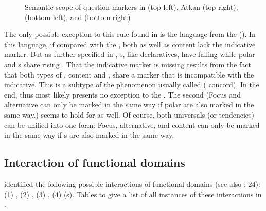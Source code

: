 \begin{figure}
\caption{Semantic scope of question markers in  (top left), Atkan  (top right),  (bottom left), and  (bottom right)}
\label{fig:6:1}
\end{figure}

The only possible exception to this rule found in  is the  language  from the   (\citealt{Davis2015}). In this language, if compared with the , both  as well as content  lack the indicative marker. But as further specified in , s, like declaratives, have falling  while polar and s share rising . That the indicative marker is missing results from the fact that both types of , content and , share a  marker that is incompatible with the indicative. This is a subtype of the phenomenon usually called \textit{} ( concord). In the end,  thus most likely presents no exception to the . The second  (Focus and alternative  can only be marked in the same way if polar  are also marked in the same way.) seems to hold for  as well. Of course, both universals (or tendencies) can be unified into one form: Focus, alternative, and content  can only be marked in the same way if s are also marked in the same way.

\subsection{Interaction of functional domains}\label{sec:6.1.3}

 identified the following possible interactions of functional domains (see also \citealt{Hölzl2016a}: 24): (1) , (2) , (3) , (4)  (s). Tables  to  give a list of all instances of these interactions in .

